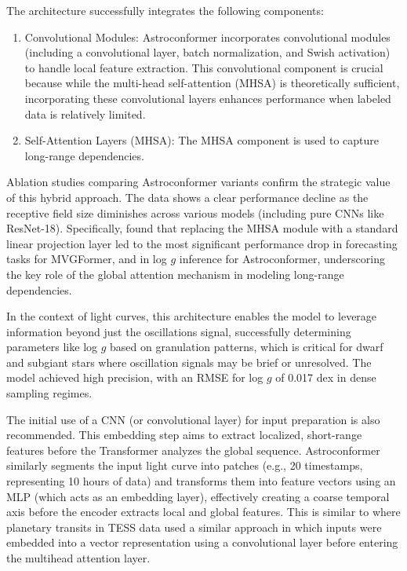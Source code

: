 \documentclass[letterpaper]{article} %
\begin{document}
The architecture successfully integrates the following components:

\begin{enumerate}
    \item {Convolutional Modules:} Astroconformer incorporates convolutional modules (including a convolutional layer, batch normalization, and Swish activation) to handle local feature extraction. This convolutional component is crucial because while the multi-head self-attention (MHSA) is theoretically sufficient, incorporating these convolutional layers enhances performance when labeled data is relatively limited.
    
    \item {Self-Attention Layers (MHSA):} The MHSA component is used to capture long-range dependencies.
\end{enumerate}

Ablation studies comparing Astroconformer variants confirm the strategic value of this hybrid approach. The data shows a clear performance decline as the receptive field size diminishes across various models (including pure CNNs like ResNet-18). Specifically, \citeauthor{pan2024astroconformer} found that replacing the MHSA module with a standard linear projection layer led to the most significant performance drop in forecasting tasks for MVGFormer, and in log $g$ inference for Astroconformer, underscoring the key role of the global attention mechanism in modeling long-range dependencies.

In the context of light curves, this architecture enables the model to leverage information beyond just the oscillations signal, successfully determining parameters like log $g$ based on granulation patterns, which is critical for dwarf and subgiant stars where oscillation signals may be brief or unresolved. The model achieved high precision, with an RMSE for log $g$ of 0.017 dex in dense sampling regimes.

The initial use of a CNN (or convolutional layer) for input preparation is also recommended. This embedding step aims to extract localized, short-range features before the Transformer analyzes the global sequence. Astroconformer similarly segments the input light curve into patches (e.g., 20 timestamps, representing 10 hours of data) and transforms them into feature vectors using an MLP (which acts as an embedding layer), effectively creating a coarse temporal axis before the encoder extracts local and global features. This is similar to \cite{salinas2023distinguishingtransitfalsepositives} where planetary transits in TESS data used a similar approach in which inputs were embedded into a vector representation using a convolutional layer before entering the multihead attention layer. 
\end{document}
